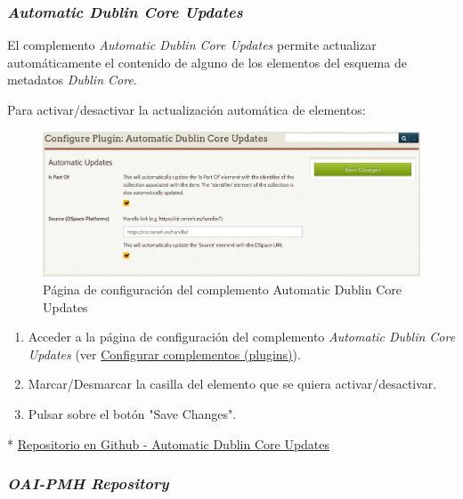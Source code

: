 \documentclass[
]{article}
\providecommand{\tightlist}{%
  \setlength{\itemsep}{0pt}\setlength{\parskip}{0pt}}
\begin{document}
\hypertarget{automatic-dublin-core-updates}{%
\subsubsection{\texorpdfstring{\emph{Automatic Dublin Core
Updates}}{Automatic Dublin Core Updates}}\label{automatic-dublin-core-updates}}

El complemento \emph{Automatic Dublin Core Updates} permite actualizar
automáticamente el contenido de alguno de los elementos del esquema de
metadatos \emph{Dublin Core}.

Para activar/desactivar la actualización automática de elementos:

\begin{figure}
\hypertarget{auto-dublin-core}{%
\centering
\includegraphics{../_static/images/autodublincore.png}
\caption{Página de configuración del complemento Automatic Dublin Core
Updates}\label{auto-dublin-core}
}
\end{figure}

\begin{enumerate}
\def\labelenumi{\arabic{enumi}.}
\tightlist
\item
  Acceder a la página de configuración del complemento \emph{Automatic
  Dublin Core Updates} (ver
  \protect\hyperlink{configurar-complementos-plugins}{Configurar
  complementos (plugins)}).
\item
  Marcar/Desmarcar la casilla del elemento que se quiera
  activar/desactivar.
\item
  Pulsar sobre el botón "Save Changes".
\end{enumerate}

*
\href{https://github.com/gcm1001/TFG-CeniehAriadne/tree/master/omeka/plugins/AutoDublinCore}{Repositorio
en Github - Automatic Dublin Core Updates}

\hypertarget{oai-pmh-repository}{%
\subsubsection{\texorpdfstring{\emph{OAI-PMH
Repository}}{OAI-PMH Repository}}\label{oai-pmh-repository}}
\end{document}
